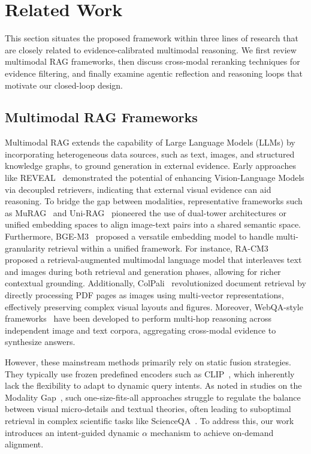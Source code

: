 \documentclass[a4paper, fleqn]{cas-dc}
\begin{document}
\section{Related Work}\label{sec:relatedwork}
This section situates the proposed framework within three lines of research that are closely related to evidence-calibrated multimodal reasoning.
We first review multimodal RAG frameworks, then discuss cross-modal reranking techniques for evidence filtering, and finally examine agentic reflection and reasoning loops that motivate our closed-loop design.

\subsection{Multimodal RAG Frameworks}

Multimodal RAG extends the capability of Large Language Models (LLMs) by incorporating heterogeneous data sources, such as text, images, and structured knowledge graphs, to ground generation in external evidence.
Early approaches like REVEAL~\cite{Hu2023} demonstrated the potential of enhancing Vision-Language Models via decoupled retrievers, indicating that external visual evidence can aid reasoning.
To bridge the gap between modalities, representative frameworks such as MuRAG~\cite{Chen2022} and Uni-RAG~\cite{Li2025} pioneered the use of dual-tower architectures or unified embedding spaces to align image-text pairs into a shared semantic space.
Furthermore, BGE-M3~\cite{Chen2024} proposed a versatile embedding model to handle multi-granularity retrieval within a unified framework.
For instance, RA-CM3~\cite{Yasunaga2023} proposed a retrieval-augmented multimodal language model that interleaves text and images during both retrieval and generation phases, allowing for richer contextual grounding.
Additionally, ColPali~\cite{Faysse2025} revolutionized document retrieval by directly processing PDF pages as images using multi-vector representations, effectively preserving complex visual layouts and figures.
Moreover, WebQA-style frameworks~\cite{Chang2022} have been developed to perform multi-hop reasoning across independent image and text corpora, aggregating cross-modal evidence to synthesize answers.

However, these mainstream methods primarily rely on static fusion strategies.
They typically use frozen predefined encoders such as CLIP~\cite{Radford2021}, which inherently lack the flexibility to adapt to dynamic query intents.
As noted in studies on the Modality Gap~\cite{Liang2022}, such one-size-fits-all approaches struggle to regulate the balance between visual micro-details and textual theories, often leading to suboptimal retrieval in complex scientific tasks like ScienceQA~\cite{Lu2022}.
To address this, our work introduces an intent-guided dynamic $\alpha$ mechanism to achieve on-demand alignment.
\end{document}
